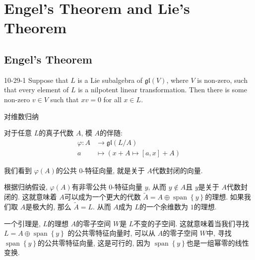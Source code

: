 \documentclass[../main.tex]{subfiles}
\begin{document}
\ifSubfilesClassLoaded{

    
}{}

\chapter{  Engel’s Theorem and Lie’s Theorem }

\section{Engel's Theorem}
\begin{lemma}{}{10-29-1}
    Suppose that $L$ is a Lie subalgebra of $\mathfrak{gl}(V)$, where $V$ is non-zero, such that every element of $L$ is a nilpotent linear transformation. Then there is some non-zero $v \in V$ such that $xv = 0$ for all $x \in L$.
\end{lemma}
\begin{proofsketch}

    对维数归纳


    对于任意 \(  L  \)的真子代数 \(  A  \), 模 \(  A  \)的伴随: \[
  \begin{aligned}
    \varphi : A&\to \mathfrak{gl}\left( L/A \right)  \\ 
     a & \mapsto \left( x+ A\mapsto [a,x]+ A \right) 
  \end{aligned}
    \]   

    我们看到 \(   \varphi \left( A \right)   \)的公共 \(  0  \)-特征向量, 就是关于 \(  A  \)代数封闭的向量.   

    根据归纳假设,  \(   \varphi \left( A \right)   \)有非零公共 \(  0  \)-特征向量 \(  y  \), 从而 \(  y\not \in A  \)且 \(  y  \)是关于 \(  A  \)代数封闭的.     这就意味着 \(  A  \)可以成为一个更大的代数 \(  \tilde{A}= A\oplus \operatorname{span}\left\{ y \right\}  \)的理想. 如果我们取 \(  A  \)是极大的, 那么 \(  \tilde{A}= L  \). 从而 \(  A  \)成为 \(  L  \)的一个余维数为 \(  1  \)的理想.
    
    一个引理是, \(  L  \)的理想 \(  A  \)的零子空间 \(  W  \)是 \(  L  \)不变的子空间.     这就意味着当我们寻找 \(L=   A\oplus \operatorname{span}\left\{ y \right\}  \) 的公共零特征向量时, 可以从 \(  A  \)的零子空间 \(  W  \)中, 寻找 \(  \operatorname{span}\left\{ y \right\}  \)的公共零特征向量, 这是可行的, 因为 \(  \operatorname{span}\left\{ y \right\}  \)也是一组幂零的线性变换.    
\end{proofsketch}
\end{document}
